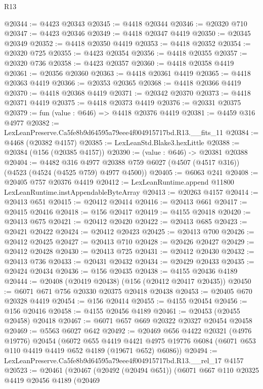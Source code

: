 \begin{lexlean}{R13}
\begin{coremodule}
@20344 := @4423 @20343
@20345 := @4418 @20344
@20346 := @20320 @710
@20347 := @4423 @20346
@20349 := @4418 @20347 @4419
@20350 := @20345 @20349
@20352 := @4418 @20350 @4419
@20353 := @4418 @20352
@20354 := @20320 @725
@20355 := @4423 @20354
@20356 := @4418 @20355
@20357 := @20320 @736
@20358 := @4423 @20357
@20360 := @4418 @20358 @4419
@20361 := @20356 @20360
@20363 := @4418 @20361 @4419
@20365 := @4418 @20363 @4419
@20366 := @20353 @20365
@20368 := @4418 @20366 @4419
@20370 := @4418 @20368 @4419
@20371 := @20342 @20370
@20373 := @4418 @20371 @4419
@20375 := @4418 @20373 @4419
@20376 := @20331 @20375
@20379 := fun (value : @646) => @4418 @20376 @4419
@20381 := @4459 @316 @4977
@20382 := LexLeanPreserve.Ca5fe8b9d64595a79eee4f004915717bd.R13.__fits_11
@20384 := @4468 (@20382 @4157)
@20385 := LexLeanStd.Blake3.hexLittle
@20388 := @20384 (@156 (@20385 @4157))
@20390 := (value : @646) -> @20381 @20388
@20404 := @4482
    @316
    @4977
    @20388
    @759
    @6027
    (@4507 (@4517 @316))
    (@4523 (@4524 (@4525 @759) @4977 @4500))
@20405 := @6063 @241
@20408 := @20405 @757 @20376 @4419
@20412 := LexLeanRuntime.append @11800 LexLeanRuntime.instAppendableByteArray
@20413 := @20263 @4157
@20414 := @20413 @651
@20415 := @20412 @20414
@20416 := @20413 @661
@20417 := @20415 @20416
@20418 := @156 @20417
@20419 := @4155 @20418
@20420 := @20413 @675
@20421 := @20412 @20420
@20422 := @20413 @685
@20423 := @20421 @20422
@20424 := @20412 @20423
@20425 := @20413 @700
@20426 := @20412 @20425
@20427 := @20413 @710
@20428 := @20426 @20427
@20429 := @20412 @20428
@20430 := @20413 @725
@20431 := @20412 @20430
@20432 := @20413 @736
@20433 := @20431 @20432
@20434 := @20429 @20433
@20435 := @20424 @20434
@20436 := @156 @20435
@20438 := @4155 @20436 @4189
@20444 := @20408 (@20419 @20438) (@156 (@20412 @20417 @20435))
@20450 := @6071 @671 @756 @20330 @20375 @20418 @20438
@20453 := @20405 @670 @20328 @4419
@20454 := @156 @20414
@20455 := @4155 @20454
@20456 := @156 @20416
@20458 := @4155 @20456 @4189
@20461 := @20453 (@20455 @20458) @20418
@20467 := @6071 @657 @669 @20322 @20327 @20454 @20458
@20469 := @5563 @6027 @642
@20492 := @20469
    @656
    @4422
    @20321
    (@4976 @19776)
    @20454
    (@6072
      @655
      @4419
      @4421
      @4975
      @19776
      @6084
      (@6071 @653 @110 @4419 @4419 @652 @4189 (@19671 @652) @6086))
@20494 := LexLeanPreserve.Ca5fe8b9d64595a79eee4f004915717bd.R13.__rel_17 @4157
@20523 := @20461
    (@20467
      (@20492 (@20494 @651))
      (@6071
        @667
        @110
        @20325
        @4419
        @20456
        @4189
        (@20469

\end{coremodule}
\end{lexlean}
